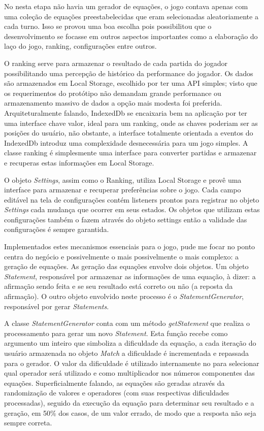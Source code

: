 \begin{draft}
No nesta etapa não havia um gerador de equações, o jogo
contava apenas com uma coleção de equações preestabelecidas que eram
selecionadas aleatoriamente a cada turno. Isso se provou uma boa escolha
pois possibilitou que o desenvolvimento se focasse em outros aspectos
importantes como a elaboração do laço do jogo, ranking, configurações entre outros.

O ranking serve para armazenar o resultado de cada partida do jogador
possibilitando uma percepção de histórico da performance do jogador.
Os dados são armazenados em Local Storage, escolhido por
ter uma API simples; visto que os requerimentos do protótipo não
demandam grande performance ou armazenamento massivo de dados a opção
mais modesta foi preferida. Arquiteturalmente falando, IndexedDb se
encaixaria bem na aplicação por ter uma interface chave valor,
ideal para um ranking, onde as chaves poderiam ser as posições do usuário,
não obstante, a interface totalmente orientada a eventos do IndexedDb
introduz uma complexidade desnecessária para um jogo simples.
A classe ranking é simplesmente uma interface para converter partidas e armazenar
e recuperas estas informações em Local Storage.

O objeto \textit{Settings}, assim como o Ranking, utiliza Local Storage
e provê uma interface para armazenar e recuperar preferências sobre o jogo.
Cada campo editável na tela de configurações contém listeners prontos
para registrar no objeto \textit{Settings} cada mudança que ocorrer em seus estados.
Os objetos que utilizam estas configurações também o fazem através do objeto settings
então a validade das configurações é sempre garantida.

Implementados estes mecanismos essenciais para o jogo, pude me focar no
ponto centra do negócio e possivelmente o mais possivelmente o mais
complexo: a geração de equações. As geração das equações envolve
dois objetos. Um objeto \textit{Statement}, responsável por armazenar
as informações de uma equação, à dizer: a afirmação sendo feita e
se seu resultado está correto ou não (a reposta da afirmação).
O outro objeto envolvido neste processo é o \textit{StatementGenerator},
responsável por gerar \textit{Statements}.

A classe \textit{StatementGenerator} conta com um método
\textit{getStatement} que realiza o processamento para gerar um novo
\textit{Statement}. Esta função recebe como argumento um inteiro que
simboliza a dificuldade da equação, a cada iteração do usuário
armazenada no objeto \textit{Match} a dificuldade é incrementada
e repassada para o gerador. O valor da dificuldade é utilizado
internamente no para selecionar qual operador será utilizado e como
multiplicador nos números componentes das equações. Superficialmente
falando, as equações são geradas através da randomização de
valores e operadores (com suas respectivas dificuldades processadas),
seguido da execução da equação para determinar seu resultado e a
geração, em 50\% dos casos, de um valor errado, de modo que a resposta
não seja sempre correta. 


\end{draft}
